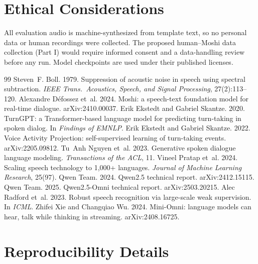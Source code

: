\documentclass[11pt,a4paper,twocolumn]{article}
\begin{document}
\section*{Ethical Considerations}

All evaluation audio is machine-synthesized from template text, so no personal data or human recordings were collected. The proposed human--Moshi data collection (Part I) would require informed consent and a data-handling review before any run. Model checkpoints are used under their published licenses.


\begin{thebibliography}{99}
 Steven~F. Boll. 1979. Suppression of acoustic noise in speech using spectral subtraction. \emph{IEEE Trans.\ Acoustics, Speech, and Signal Processing}, 27(2):113--120.
 Alexandre D\'efossez et~al. 2024. Moshi: a speech-text foundation model for real-time dialogue. arXiv:2410.00037.
 Erik Ekstedt and Gabriel Skantze. 2020. TurnGPT: a Transformer-based language model for predicting turn-taking in spoken dialog. In \emph{Findings of EMNLP}.
 Erik Ekstedt and Gabriel Skantze. 2022. Voice Activity Projection: self-supervised learning of turn-taking events. arXiv:2205.09812.
 Tu~Anh Nguyen et~al. 2023. Generative spoken dialogue language modeling. \emph{Transactions of the ACL}, 11.
 Vineel Pratap et~al. 2024. Scaling speech technology to 1,000+ languages. \emph{Journal of Machine Learning Research}, 25(97).
 Qwen Team. 2024. Qwen2.5 technical report. arXiv:2412.15115.
 Qwen Team. 2025. Qwen2.5-Omni technical report. arXiv:2503.20215.
 Alec Radford et~al. 2023. Robust speech recognition via large-scale weak supervision. In \emph{ICML}.
 Zhifei Xie and Changqiao Wu. 2024. Mini-Omni: language models can hear, talk while thinking in streaming. arXiv:2408.16725.
\end{thebibliography}

\appendix

\section{Reproducibility Details}
\label{app:repro}
\end{document}
